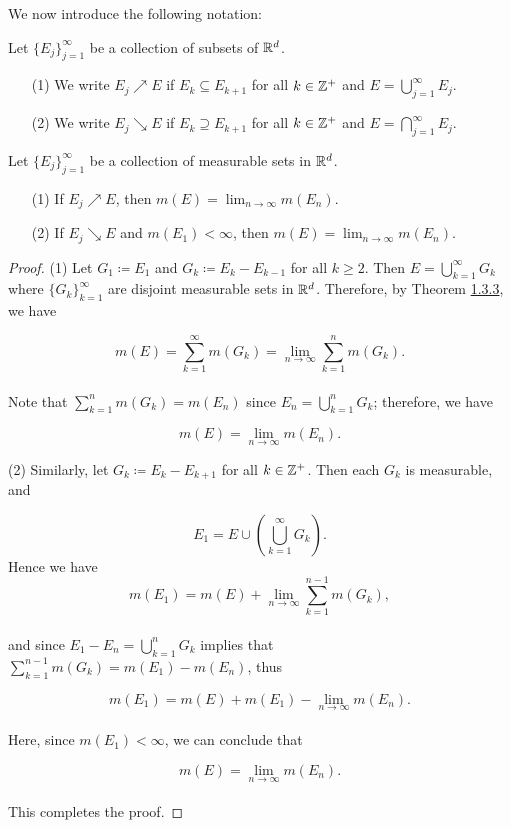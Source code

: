 \documentclass[12pt, a4paper, openany, twoside]{book}
\theoremstyle{definition}
\theoremstyle{remark}
\theoremstyle{plain}
\numberwithin{equation}{section}
\begin{document}
We now introduce the following notation:
\vspace{5mm}
\begin{tcolorbox}[colback=yellow!10!white,colframe=blue!75!black,title=Definition 1.3.2]\label{Definition 1.3.2}
    Let $\{E_j\}_{j=1}^{\infty}$ be a collection of subsets of ${\mathbb {R}}^d$.
    \begin{enumerate}
        \item [(1)] We write $E_j\nearrow E$ if $E_k\subseteq E_{k+1}$ for all $k\in{\mathbb {Z}}^+$ and $E=\bigcup_{j=1}^{\infty}{E_j}$.
        \item [(2)] We write $E_j\searrow E$ if $E_k\supseteq E_{k+1}$ for all $k\in{\mathbb {Z}}^+$ and $E=\bigcap_{j=1}^{\infty}{E_j}$.
    \end{enumerate}
\end{tcolorbox}
\vspace{5mm}
\begin{tcolorbox}[colback=yellow!10!white,colframe=red!75!black,title=Corollary 1.3.4]\label{Corollary 1.3.4}
    Let $\{E_j\}_{j=1}^{\infty}$ be a collection of measurable sets in ${\mathbb {R}}^d$.
    \begin{enumerate}
        \item [(1)] If $E_j\nearrow E$, then $m(E)=\lim_{n\rightarrow\infty}{m(E_n)}$.
        \item [(2)] If $E_j\searrow E$ and $m(E_1)<\infty$, then $m(E)=\lim_{n\rightarrow\infty}{m(E_n)}$.
    \end{enumerate}
\end{tcolorbox}
\begin{proof}
    (1) Let $G_1\coloneqq E_1$ and $G_k\coloneqq E_k-E_{k-1}$ for all $k\geq 2$. Then $E=\bigcup_{k=1}^{\infty}{G_k}$ where $\{G_k\}_{k=1}^{\infty}$ are disjoint measurable sets in ${\mathbb {R}}^d$. Therefore, by Theorem \hyperref[Theorem 1.3.3]{1.3.3}, we have

    \[m(E)=\sum_{k=1}^{\infty}{m(G_k)}=\lim_{n\rightarrow\infty}{\sum_{k=1}^{n}{m(G_k)}}.\]
    \\
    Note that $\sum_{k=1}^{n}{m(G_k)}=m(E_n)$ since $E_n=\bigcup_{k=1}^{n}{G_k}$; therefore, we have

    \[m(E)=\lim_{n\rightarrow\infty}{m(E_n)}.\]

    \vspace{5mm}
    (2) Similarly, let $G_k\coloneqq E_k-E_{k+1}$ for all $k\in{\mathbb {Z}}^+$. Then each $G_k$ is measurable, and

    \[E_1=E\cup\left(\bigcup_{k=1}^{\infty}{G_k}\right).\]
    Hence we have 
    \[m(E_1)=m(E)+\lim_{n\rightarrow\infty}{\sum_{k=1}^{n-1}{m(G_k)}},\]
    \\
    and since $E_1-E_n=\bigcup_{k=1}^{n}{G_k}$ implies that $\sum_{k=1}^{n-1}{m(G_k)}=m(E_1)-m(E_n)$, thus

    \[m(E_1)=m(E)+m(E_1)-\lim_{n\rightarrow\infty}{m(E_n)}.\]
    \\
    Here, since $m(E_1)<\infty$, we can conclude that 

    \[m(E)=\lim_{n\rightarrow\infty}{m(E_n)}.\]
    \\
    This completes the proof.
\end{proof}
\vspace{5mm}
\end{document}
